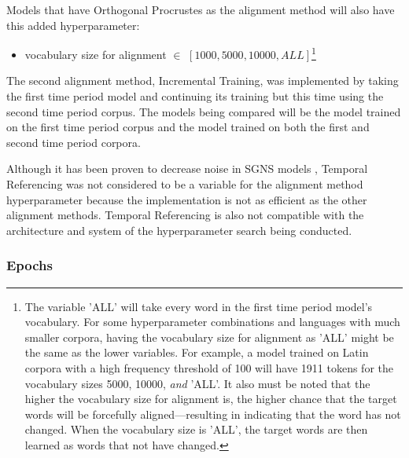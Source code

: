Models that have Orthogonal Procrustes as the alignment method will also have this added hyperparameter:
\begin{itemize}
    \item vocabulary size for alignment $\in$ $[1000, 5000, 10000, ALL]$\footnote{The variable 'ALL' will take every word in the first time period model's vocabulary. For some hyperparameter combinations and languages with much smaller corpora, having the vocabulary size for alignment as 'ALL' might be the same as the lower variables. For example, a model trained on Latin corpora with a high frequency threshold of 100 will have 1911 tokens for the vocabulary sizes 5000, 10000, \emph{and} 'ALL'. It also must be noted that the higher the vocabulary size for alignment is, the higher chance that the target words will be forcefully aligned—resulting in indicating that the word has not changed. When the vocabulary size is 'ALL', the target words are then learned as words that not have changed.} 
\end{itemize}%


The second alignment method,  Incremental Training, was implemented by taking the first time period model and continuing its training but this time using the second time period corpus. The models being compared will be the model trained on the first time period corpus and the model trained on both the first and second time period corpora.

Although it has been proven to decrease noise in SGNS models \citep{dubossarsky-etal-2019-time}, Temporal Referencing was not considered to be a variable for the alignment method hyperparameter because the implementation is not as efficient as the other alignment methods. Temporal Referencing is also not compatible with the architecture and system of the hyperparameter search being conducted. 


\subsubsection{Epochs} 
\label{exp-epochs}

